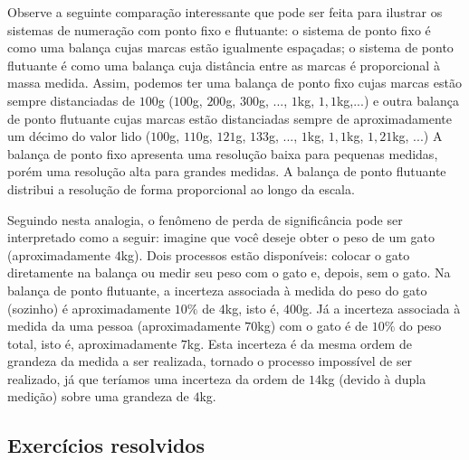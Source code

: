 \begin{ex} Observe a seguinte comparação interessante que pode ser feita para ilustrar os sistemas de numeração com ponto fixo e flutuante: o sistema de ponto fixo é como uma balança cujas marcas estão igualmente espaçadas; o sistema de ponto flutuante é como uma balança cuja distância entre as marcas é proporcional à massa medida. Assim, podemos ter uma balança de ponto fixo cujas marcas estão sempre distanciadas de $100$g ($100$g, $200$g, $300$g, ..., $1$kg, $1,1$kg,...) e outra balança de ponto flutuante cujas marcas estão distanciadas sempre de aproximadamente um décimo do valor lido ($100$g, $110$g, $121$g, $133$g, ..., $1$kg, $1,1$kg, $1,21$kg, ...) A balança de ponto fixo apresenta uma resolução baixa para pequenas medidas, porém uma resolução alta para grandes medidas. A balança de ponto flutuante distribui a resolução de forma proporcional ao longo da escala.

Seguindo nesta analogia, o fenômeno de perda de significância pode ser interpretado como a seguir: imagine que você deseje obter o peso de um gato (aproximadamente $4$kg). Dois processos estão disponíveis: colocar o gato diretamente na balança ou medir seu peso com o gato e, depois, sem o gato. Na balança de ponto flutuante, a incerteza associada à medida do peso do gato (sozinho) é aproximadamente $10\%$ de $4$kg, isto é, $400$g. Já a incerteza associada à medida da uma pessoa (aproximadamente $70$kg) com o gato é de $10\%$ do peso total, isto é, aproximadamente $7$kg. Esta incerteza é da mesma ordem de grandeza da medida a ser realizada, tornado o processo impossível de ser realizado, já que teríamos uma incerteza da ordem de $14$kg (devido à dupla medição) sobre uma grandeza de $4$kg.
\end{ex}

\subsection*{Exercícios resolvidos}

